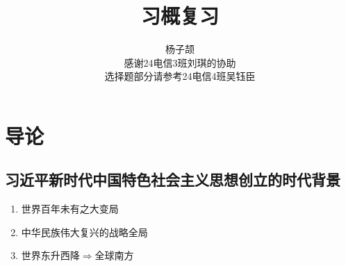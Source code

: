 \documentclass{ctexart}
\title{习概复习}
\author{杨子颉\\[0.5em] 感谢24电信3班刘琪的协助\\选择题部分请参考24电信4班吴钰臣}
\numberwithin{figure}{section}
\numberwithin{equation}{section}
\begin{document}
\maketitle

\tableofcontents
\newpage
\section{导论}
    \subsection{习近平新时代中国特色社会主义思想创立的时代背景}
        \begin{enumerate}
            \item 世界百年未有之大变局
            \item 中华民族伟大复兴的战略全局
            \item 世界东升西降$\Longrightarrow$全球南方
        \end{enumerate}
\end{document}
